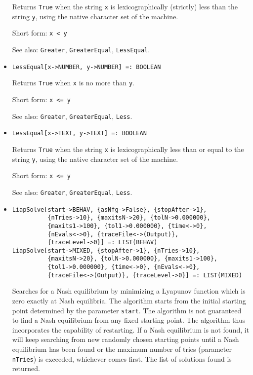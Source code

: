 \begin{itemize}
\bd
Returns \verb+True+ when the string \verb+x+ is lexicographically (strictly)
less than
the string \verb+y+, using the native character set of the machine.
\item [Short form:] \verb+x < y+
\item [See also:] \verb+Greater+, \verb+GreaterEqual+, \verb+LessEqual+.
\ed

\item{}
\protect \large \begin{verbatim}
LessEqual[x->NUMBER, y->NUMBER] =: BOOLEAN 
\end{verbatim}\normalsize

\bd
Returns \verb+True+ when \verb+x+ is no more than \verb+y+.
\item [Short form:] \verb+x <= y+
\item [See also:] \verb+Greater+, \verb+GreaterEqual+, \verb+Less+.
\ed

\item{}
\protect \large \begin{verbatim}
LessEqual[x->TEXT, y->TEXT] =: BOOLEAN 
\end{verbatim}\normalsize

\bd
Returns \verb+True+ when the string \verb+x+ is lexicographically less than
or equal to the string \verb+y+, using the native character set of the machine.
\item [Short form:] \verb+x <= y+
\item [See also:] \verb+Greater+, \verb+GreaterEqual+, \verb+Less+.
\ed

\item{}
\protect \large \begin{verbatim}
LiapSolve[start->BEHAV, {asNfg->False}, {stopAfter->1}, 
          {nTries->10}, {maxitsN->20}, {tolN->0.000000}, 
          {maxits1->100}, {tol1->0.000000}, {time<->0}, 
          {nEvals<->0}, {traceFile<->(Output)}, 
          {traceLevel->0}] =: LIST(BEHAV) 
LiapSolve[start->MIXED, {stopAfter->1}, {nTries->10}, 
          {maxitsN->20}, {tolN->0.000000}, {maxits1->100}, 
          {tol1->0.000000}, {time<->0}, {nEvals<->0}, 
          {traceFile<->(Output)}, {traceLevel->0}] =: LIST(MIXED) 
\end{verbatim}\normalsize


\bd 
Searches for a Nash equilibrium by minimizing a Lyapunov function
which is zero exactly at Nash equilibria.  The algorithm starts from
the initial starting point determined by the parameter \verb+start+.
The algorithm is not guaranteed to find a Nash equilibrium from any
fixed starting point.  The algorithm thus incorporates the capability
of restarting.  If a Nash equilibrium is not found, it will keep
searching from new randomly chosen starting points until a Nash
equilibrium has been found or the maximum number of tries (parameter
\verb+nTries+) is exceeded, whichever comes first.  The list of
solutions found is returned.


\end{itemize}
